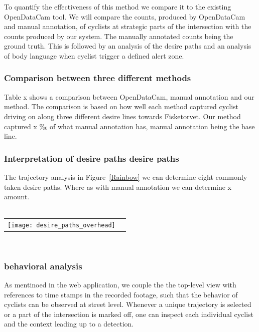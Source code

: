 To quantify the effectiveness of this method we compare it to the existing OpenDataCam tool.
We will compare the counts, produced by OpenDataCam and manual annotation, of cyclists at strategic parts of the intersection with the counts produced by our system. The manually annotated counts being the ground truth.
This is followed by an analysis of the desire paths and an analysis of body language when cyclist trigger a defined
alert zone.
\ \\ 

\subsubsection{Comparison between three different methods}
Table x shows a comparison between OpenDataCam, manual annotation and our method.
The comparison is based on how well each method captured cyclist driving on along three different 
desire lines towards Fisketorvet.
Our method captured x ‰ of what manual annotation has, manual annotation being the base line.
\ \\

\subsubsection{Interpretation of desire paths desire paths}
The trajectory analysis in Figure~\ref{Rainbow} we can determine eight commonly taken desire paths. 
Where as with manual annotation we can determine x amount.
\ \\
\raggedbottom
\ \\ 
\noindent
\begin{tabular}{@{}cc}
\texttt{[image: desire\_paths\_overhead]} 
\end{tabular}
\label{traject}

\ \\
\subsubsection{behavioral analysis}
As mentinoed in the web application, we couple the the top-level view with references to time stamps in the recorded footage, 
such that the behavior of cyclists can be observed at street level.
Whenever a unique trajectory is selected or a part of the intersection is marked off, one can inspect each individual cyclist 
and the context leading up to a detection.
\\


